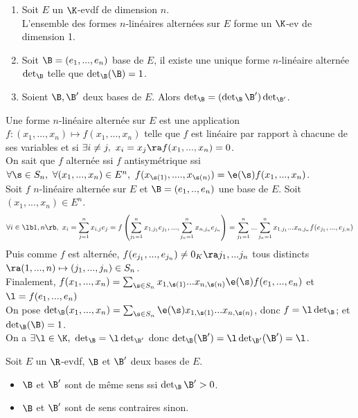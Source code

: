 \documentclass[11pt]{article}
\begin{document}
\begin{prop}{}{}
    \begin{enumerate}
        \item Soit $E$ un $\K$-evdf de dimension $n$.\\
        L'ensemble des formes $n$-linéaires alternées sur $E$ forme un $\K$-ev de dimension 1.
        \item Soit $\B=(e_1,...,e_n)$ base de $E$, il existe une unique forme $n$-linéaire alternée $\det_\B$ telle que $\det_\B(\B)=1$.
        \item Soient $\B,\B'$ deux bases de $E$. Alors $\det_\B=(\det_\B \B')\det_{\B'}$.
    \end{enumerate}
    \tcblower
     Une forme $n$-linéaire alternée sur $E$ est une application $f:(x_1,...,x_n)\mapsto f(x_1,...,x_n)$ telle que $f$ est linéaire par rapport à chacune de ses variables et si $\exists i \neq j, ~ x_i = x_j \ra f(x_1,...,x_n)=0$.\\
    On sait que $f$ alternée ssi $f$ antisymétrique ssi $\forall \s \in S_n, ~ \forall (x_1,...,x_n) \in E^n, ~ f(x_{\s(1)},....,x_{\s(n)})=\e(\s)f(x_1,...,x_n)$.\\
    Soit $f$ $n$-linéaire alternée sur $E$ et $\B=(e_1,..,e_n)$ une base de $E$. Soit $(x_1,...,x_n)\in E^n$.
    \begin{equation*}
        \forall i \in \lb1,n\rb, ~ x_i = \sum_{j=1}^n x_{i,j}e_j = f\left( \sum_{j_1=1}^n x_{1,j_1}e_{j_1}, ..., \sum_{j_n=1}^n x_{n,j_n}e_{j_n} \right)=\sum_{j_1=1}^n...\sum_{j_n=1}^n x_{1,j_1}...x_{n,j_n}f(e_{j_1},...,e_{j,n})
    \end{equation*}
    Puis comme $f$ est alternée, $f(e_{j_1},...,e_{j_n})\neq0_K\ra j_1,...j_n$ tous distincts $\ra(1,...,n)\mapsto(j_1,...,j_n)\in S_n$.\\
    Finalement, $f(x_1,...,x_n)=\sum_{\s\in S_n}x_{1,\s(1)}...x_{n,\s(n)}\e(\s)f(e_{1},...,e_{n})$ et $\l=f(e_1,...,e_n)$\\
    On pose $\det_\B(x_1,...,x_n)=\sum_{\s\in S_n}\e(\s)x_{1,\s(1)}...x_{n,\s(n)}$, donc $f=\l\det_\B$; et $\det_\B(\B)=1$.\\
     On a $\exists \l \in \K, ~ \det_\B=\l\det_{\B'}$ donc $\det_\B(\B')=\l\det_{\B'}(\B')=\l$.
\end{prop}

\begin{defi}{}{}
    Soit $E$ un $\R$-evdf, $\B$ et $\B'$ deux bases de $E$.
    \begin{itemize}
        \item $\B$ et $\B'$ sont de même sens ssi $\det_\B \B'>0$.
        \item $\B$ et $\B'$ sont de sens contraires sinon.
    \end{itemize}
\end{defi}
\end{document}
